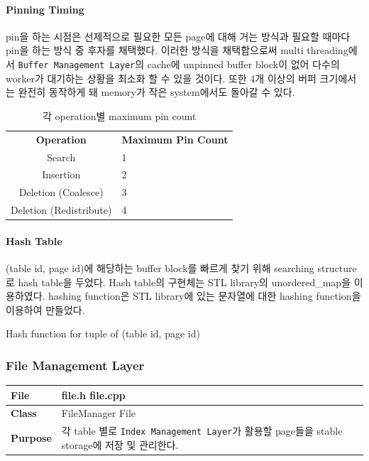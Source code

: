 \documentclass[main.tex]{subfiles}
\begin{document}
\paragraph{Pinning Timing}
pin을 하는 시점은 선제적으로 필요한 모든 page에 대해 거는 방식과 필요할 때마다 pin을 하는 방식 중 후자를 채택했다. 이러한 방식을 채택함으로써 multi threading에서 \texttt{Buffer Management Layer}의 cache에 unpinned buffer block이 없어 다수의 worker가 대기하는 상황을 최소화 할 수 있을 것이다. 또한 4개 이상의 버퍼 크기에서는 완전히 동작하게 돼 memory가 작은 system에서도 돌아갈 수 있다.

\begin{table}[!htb]
	\centering
	\begin{tabularx}{.6\textwidth}{|c|X|}
		\hline
		\textbf{Operation} & \textbf{Maximum Pin Count} \\
		\hhline{|=|=|}
		Search & 1 \\
		\hline
		Insertion & 2 \\
		\hline
		Deletion (Coalesce) & 3 \\
		\hline
		Deletion (Redistribute) & 4 \\
		\hline
	\end{tabularx}
	\caption{각 operation별 maximum pin count}
\end{table}


\paragraph{Hash Table}
(table id, page id)에 해당하는 buffer block를 빠르게 찾기 위해 searching structure로 hash table을 두었다. Hash table의 구현체는 STL library의 unordered\_map을 이용하였다.
hashing function은 STL library에 있는 문자열에 대한 hashing function을 이용하여 만들었다.

\begin{algorithm}
	\caption{Hash function for tuple of (table id, page id)}
	
	\begin{algorithmic}[lines]
		\State {}
		\EndFunction
	\end{algorithmic}
\end{algorithm}

\newpage
\subsubsection{File Management Layer}
\begin{table}[!htb]
	\begin{tabularx}{\textwidth}{|l|X|}
		\hline
		\textbf{File} & file.h file.cpp \\
		\hline
		\textbf{Class} & FileManager File \\
		\hline
		\textbf{Purpose} & 각 table 별로 \texttt{Index Management Layer}가 활용할 page들을 stable storage에 저장 및 관리한다. \\
		\hline
	\end{tabularx}
\end{table}
\end{document}
